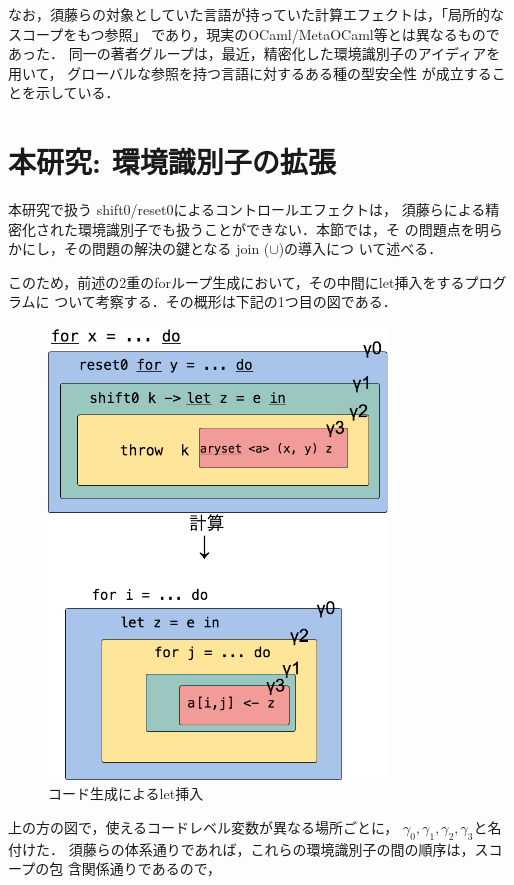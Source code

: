 なお，須藤らの対象としていた言語が持っていた計算エフェクトは，「局所的なスコープをもつ参照」
であり，現実のOCaml/MetaOCaml等とは異なるものであった．
同一の著者グループは，最近，精密化した環境識別子のアイディアを用いて，
グローバルな参照を持つ言語に対するある種の型安全性
が成立することを示している\cite{Aplas2016}．

\section{本研究: 環境識別子の拡張}

本研究で扱う shift0/reset0によるコントロールエフェクトは，
須藤らによる精密化された環境識別子でも扱うことができない．本節では，そ
の問題点を明らかにし，その問題の解決の鍵となる join ($\cup$)の導入につ
いて述べる．

このため，前述の2重のforループ生成において，その中間にlet挿入をするプログラムに
ついて考察する．その概形は下記の1つ目の図である．

\begin{figure}[ht]
  \centering
  \includegraphics[clip,height=12cm]{./img/ecex_for_non_gamma.png}
  \caption{コード生成によるlet挿入}
  \label{fig:ecex_for_non_gamma}
\end{figure}

上の方の図で，使えるコードレベル変数が異なる場所ごとに，
$\gamma_0,\gamma_1,\gamma_2,\gamma_3$と名付けた．
須藤らの体系通りであれば，これらの環境識別子の間の順序は，スコープの包
含関係通りであるので，

